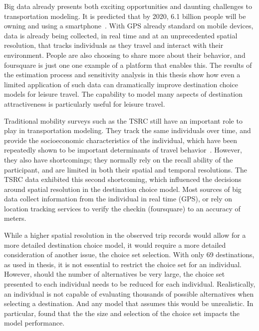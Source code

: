 Big data already presents both exciting opportunities and daunting challenges to transportation modeling. It is predicted that by 2020, 6.1 billion people will be owning and using a smartphone~\parencite{ericsson16}. With GPS already standard on mobile devices, data is already being collected, in real time and at an unprecedented spatial resolution, that tracks individuals as they travel and interact with their environment. People are also choosing to share more about their behavior, and foursquare is just one one example of a platform that enables this. The results of the estimation process and sensitivity analysis in this thesis show how even a limited application of such data can dramatically improve destination choice models for leisure travel. The capability to model many aspects of destination attractiveness is particularly useful for leisure travel.

Traditional mobility surveys such as the TSRC still have an important role to play in transportation modeling. They track the same individuals over time, and provide the socioeconomic characteristics of the individual, which have been repeatedly shown to be important determinants of travel behavior~\parencite{pas1984effect,hanson1982determinants}. However, they also have shortcomings; they normally rely on the recall ability of the participant, and are limited in both their spatial and temporal resolutions. The TSRC data exhibited this second shortcoming, which influenced the decisions around spatial resolution in the destination choice model. Most sources of big data collect information from the individual in real time (GPS), or rely on location tracking services to verify the checkin (foursquare) to an accuracy of meters.

While a higher spatial resolution in the observed trip records would allow for a more detailed destination choice model, it would require a more detailed consideration of another issue, the choice set selection. With only 69 destinations, as used in thesis, it is not essential to restrict the choice set for an individual. However, should the number of alternatives be very large, the choice set presented to each individual needs to be reduced for each individual. Realistically, an individual is not capable of evaluating thousands of possible alternatives when selecting a destination. And any model that assumes this would be unrealistic. In particular, \textcite{AkivaLerman85} found that the the size and selection of the choice set impacts the model performance.

